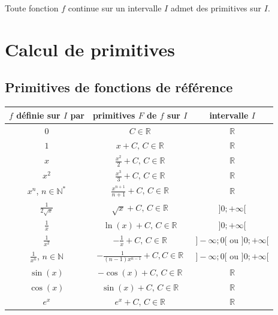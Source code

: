 \documentclass[french]{book}
\begin{document}
\begin{thm}
 Toute fonction $f$ continue sur un intervalle $I$ admet des primitives sur $I$.
\end{thm}

\section{Calcul de primitives}

\subsection{Primitives de fonctions de référence}

\begin{exemple}
\begin{center}
 \begin{tabular}{|c|c|c|}
  \hline
$f$ définie sur $I$ par & primitives $F$ de $f$ sur $I$  & intervalle $I$ \\
\hline
$0$ & $C\in \mathbb{R}$ & $\mathbb{R}$\\
\hline
$1$ & $x+C,\, C\in\mathbb{R}$ & $\mathbb{R}$\\
\hline
$x$ & $\frac{x^2}{2}+C,\, C\in\mathbb{R}$ & $\mathbb{R}$ \\
\hline
$x^2$ & $\frac{x^3}{3}+C,\, C\in\mathbb{R}$ & $\mathbb{R}$ \\
\hline
$x^n$, $n\in\mathbb{N^{*}}$ & $\frac{x^{n+1}}{n+1}+C,\, C\in\mathbb{R}$ & $\mathbb{R}$\\
\hline
$\frac{1}{2\sqrt{x}}$ & $\sqrt{x}+C,\, C\in\mathbb{R}$ & $]0;+\infty[$ \\
\hline
$\frac{1}{x}$ & $\ln (x)+C,\, C\in\mathbb{R}$& $]0;+\infty[$ \\
\hline
$\frac{1}{x^2}$ & $-\frac{1}{x}+C,\, C\in\mathbb{R}$ & $]-\infty;0[$ ou $]0;+\infty[$\\
\hline
$\frac{1}{x^n}$, $n\in\mathbb{N}$ & $-\frac{1}{(n-1)x^{n-1}}+C, C\in\mathbb{R}$ & $]-\infty;0[$ ou $]0;+\infty[$ \\
\hline
$\sin (x)$  & $-\cos (x)+C,\, C\in\mathbb{R}$ & $\mathbb{R}$ \\
\hline
$\cos (x)$ & $\sin (x)+C,\, C\in\mathbb{R}$ & $\mathbb{R}$ \\ 
\hline
$e^{x}$ &  $e^{x}+C,\, C\in\mathbb{R}$ & $\mathbb{R}$ \\
\hline
\end{tabular}
\end{center}
\end{exemple}
\end{document}
